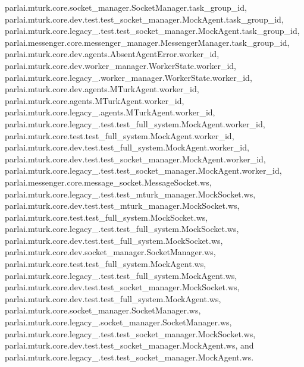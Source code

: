 parlai.\+mturk.\+core.\+socket\+\_\+manager.\+Socket\+Manager.\+task\+\_\+group\+\_\+id, parlai.\+mturk.\+core.\+dev.\+test.\+test\+\_\+socket\+\_\+manager.\+Mock\+Agent.\+task\+\_\+group\+\_\+id, parlai.\+mturk.\+core.\+legacy\+\_.\+test.\+test\+\_\+socket\+\_\+manager.\+Mock\+Agent.\+task\+\_\+group\+\_\+id, parlai.\+messenger.\+core.\+messenger\+\_\+manager.\+Messenger\+Manager.\+task\+\_\+group\+\_\+id, parlai.\+mturk.\+core.\+dev.\+agents.\+Absent\+Agent\+Error.\+worker\+\_\+id, parlai.\+mturk.\+core.\+dev.\+worker\+\_\+manager.\+Worker\+State.\+worker\+\_\+id, parlai.\+mturk.\+core.\+legacy\+\_.\+worker\+\_\+manager.\+Worker\+State.\+worker\+\_\+id, parlai.\+mturk.\+core.\+dev.\+agents.\+M\+Turk\+Agent.\+worker\+\_\+id, parlai.\+mturk.\+core.\+agents.\+M\+Turk\+Agent.\+worker\+\_\+id, parlai.\+mturk.\+core.\+legacy\+\_.\+agents.\+M\+Turk\+Agent.\+worker\+\_\+id, parlai.\+mturk.\+core.\+legacy\+\_.\+test.\+test\+\_\+full\+\_\+system.\+Mock\+Agent.\+worker\+\_\+id, parlai.\+mturk.\+core.\+test.\+test\+\_\+full\+\_\+system.\+Mock\+Agent.\+worker\+\_\+id, parlai.\+mturk.\+core.\+dev.\+test.\+test\+\_\+full\+\_\+system.\+Mock\+Agent.\+worker\+\_\+id, parlai.\+mturk.\+core.\+dev.\+test.\+test\+\_\+socket\+\_\+manager.\+Mock\+Agent.\+worker\+\_\+id, parlai.\+mturk.\+core.\+legacy\+\_.\+test.\+test\+\_\+socket\+\_\+manager.\+Mock\+Agent.\+worker\+\_\+id, parlai.\+messenger.\+core.\+message\+\_\+socket.\+Message\+Socket.\+ws, parlai.\+mturk.\+core.\+legacy\+\_.\+test.\+test\+\_\+mturk\+\_\+manager.\+Mock\+Socket.\+ws, parlai.\+mturk.\+core.\+dev.\+test.\+test\+\_\+mturk\+\_\+manager.\+Mock\+Socket.\+ws, parlai.\+mturk.\+core.\+test.\+test\+\_\+full\+\_\+system.\+Mock\+Socket.\+ws, parlai.\+mturk.\+core.\+legacy\+\_.\+test.\+test\+\_\+full\+\_\+system.\+Mock\+Socket.\+ws, parlai.\+mturk.\+core.\+dev.\+test.\+test\+\_\+full\+\_\+system.\+Mock\+Socket.\+ws, parlai.\+mturk.\+core.\+dev.\+socket\+\_\+manager.\+Socket\+Manager.\+ws, parlai.\+mturk.\+core.\+test.\+test\+\_\+full\+\_\+system.\+Mock\+Agent.\+ws, parlai.\+mturk.\+core.\+legacy\+\_.\+test.\+test\+\_\+full\+\_\+system.\+Mock\+Agent.\+ws, parlai.\+mturk.\+core.\+dev.\+test.\+test\+\_\+socket\+\_\+manager.\+Mock\+Socket.\+ws, parlai.\+mturk.\+core.\+dev.\+test.\+test\+\_\+full\+\_\+system.\+Mock\+Agent.\+ws, parlai.\+mturk.\+core.\+socket\+\_\+manager.\+Socket\+Manager.\+ws, parlai.\+mturk.\+core.\+legacy\+\_.\+socket\+\_\+manager.\+Socket\+Manager.\+ws, parlai.\+mturk.\+core.\+legacy\+\_.\+test.\+test\+\_\+socket\+\_\+manager.\+Mock\+Socket.\+ws, parlai.\+mturk.\+core.\+dev.\+test.\+test\+\_\+socket\+\_\+manager.\+Mock\+Agent.\+ws, and parlai.\+mturk.\+core.\+legacy\+\_.\+test.\+test\+\_\+socket\+\_\+manager.\+Mock\+Agent.\+ws.



